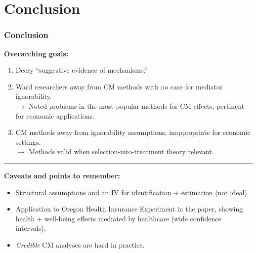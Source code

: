 \documentclass[dvipsnames]{beamer} %
\begin{document}
\section{Conclusion}
\begin{frame}
    \frametitle{Conclusion}
    \textbf{Overarching goals:}
    \begin{enumerate}
        \item Decry ``suggestive evidence of mechanisms.''
        \item Ward researchers away from CM methods with no case for mediator ignorability. \\
        $\to$ Noted problems in the most popular methods for CM effects, pertinent for economic applications.
        \item CM methods away from ignorability assumptions, inappropriate for economic settings. \\
        $\to$ Methods valid when selection-into-treatment theory relevant.
    \end{enumerate}
    \par\noindent\rule{\textwidth}{0.4pt}
    \small
    \textbf{Caveats and points to remember:}
    \begin{itemize}
        \item Structural assumptions and an IV for identification $+$ estimation (not ideal).
        \item Application to Oregon Health Insurance Experiment in the paper, showing health $+$ well-being effects mediated by healthcare (wide confidence intervals).
        \item \textit{Credible} CM analyses are hard in practice.
    \end{itemize}
\end{frame}
\end{document}
